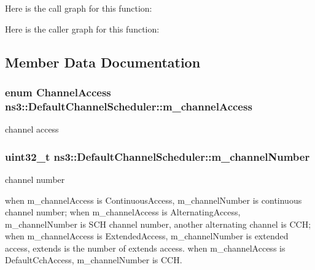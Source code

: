 Here is the call graph for this function\+:




Here is the caller graph for this function\+:




\subsection{Member Data Documentation}
\subsubsection[{\texorpdfstring{m\+\_\+channel\+Access}{m_channelAccess}}]{\setlength{\rightskip}{0pt plus 5cm}enum {\bf Channel\+Access} ns3\+::\+Default\+Channel\+Scheduler\+::m\+\_\+channel\+Access\hspace{0.3cm}{\ttfamily [private]}}\hypertarget{classns3_1_1DefaultChannelScheduler_a1316c42b27cfd480a0a2bf4f949f0402}{}\label{classns3_1_1DefaultChannelScheduler_a1316c42b27cfd480a0a2bf4f949f0402}


channel access 

\subsubsection[{\texorpdfstring{m\+\_\+channel\+Number}{m_channelNumber}}]{\setlength{\rightskip}{0pt plus 5cm}uint32\+\_\+t ns3\+::\+Default\+Channel\+Scheduler\+::m\+\_\+channel\+Number\hspace{0.3cm}{\ttfamily [private]}}\hypertarget{classns3_1_1DefaultChannelScheduler_ade2b5b6a517ae8cfaf6c476c422d0d41}{}\label{classns3_1_1DefaultChannelScheduler_ade2b5b6a517ae8cfaf6c476c422d0d41}


channel number 

when m\+\_\+channel\+Access is Continuous\+Access, m\+\_\+channel\+Number is continuous channel number; when m\+\_\+channel\+Access is Alternating\+Access, m\+\_\+channel\+Number is S\+CH channel number, another alternating channel is C\+CH; when m\+\_\+channel\+Access is Extended\+Access, m\+\_\+channel\+Number is extended access, extends is the number of extends access. when m\+\_\+channel\+Access is Default\+Cch\+Access, m\+\_\+channel\+Number is C\+CH. 
